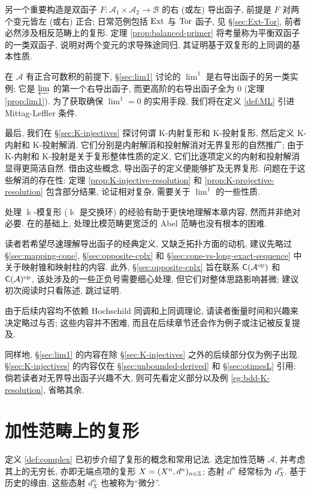 另一个重要构造是双函子 $F: \mathcal{A}_1 \times \mathcal{A}_2 \to \mathcal{B}$ 的右 (或左) 导出函子, 前提是 $F$ 对两个变元皆左 (或右) 正合; 日常范例包括 $\operatorname{Ext}$ 与 $\operatorname{Tor}$ 函子, 见 \S\ref{sec:Ext-Tor}, 前者必然涉及相反范畴上的复形. 定理 \ref{prop:balanced-primer} 将考量称为平衡双函子的一类双函子, 说明对两个变元的求导殊途同归, 其证明基于双复形的上同调的基本性质.

在 $\mathcal{A}$ 有正合可数积的前提下, \S\ref{sec:lim1} 讨论的 $\lim^1$ 是右导出函子的另一类实例; 它是 $\varprojlim$ 的第一个右导出函子, 而更高阶的右导出函子全为 $0$ (定理 \ref{prop:lim1}). 为了获取确保 $\lim^1 = 0$ 的实用手段, 我们将在定义 \ref{def:ML} 引进 Mittag-Leffler 条件.

最后, 我们在 \S\ref{sec:K-injectives} 探讨何谓 K-内射复形和 K-投射复形, 然后定义 K-内射和 K-投射解消. 它们分别是内射解消和投射解消对无界复形的自然推广; 由于 K-内射和 K-投射是关于复形整体性质的定义, 它们比逐项定义的内射和投射解消显得更简洁自然. 借由这些概念, 导出函子的定义便能够扩及无界复形. 问题在于这些解消的存在性: 定理 \ref{prop:K-injective-resolution} 和 \ref{prop:K-projective-resolution} 包含部分结果, 论证相对复杂, 需要关于 $\lim^1$ 的一些性质.

\begin{wenxintishi}	
	处理 $\Bbbk$-模复形 ($\Bbbk$ 是交换环) 的经验有助于更快地理解本章内容, 然而并非绝对必要. 在的基础上, 处理比模范畴更宽泛的 Abel 范畴也没有根本的困难.
	
	读者若希望尽速理解导出函子的经典定义, 又缺乏拓扑方面的动机, 建议先略过 \S\ref{sec:mapping-cone}, \S\ref{sec:opposite-cplx} 和 \S\ref{sec:cone-vs-long-exact-sequence} 中关于映射锥和映射柱的内容. 此外, \S\ref{sec:opposite-cplx} 旨在联系 $\mathsf{C}(\mathcal{A}^{\operatorname{op}})$ 和 $\mathsf{C}(\mathcal{A})^{\operatorname{op}}$, 该处涉及的一些正负号需要细心处理, 但它们对整体思路影响甚微; 建议初次阅读时只看陈述, 跳过证明. 

	由于后续内容均不依赖 Hochschild 同调和上同调理论, 请读者衡量时间和兴趣来决定略过与否; 这些内容并不困难, 而且在后续章节还会作为例子或注记被反复提及.

	同样地, \S\ref{sec:lim1} 的内容在除 \S\ref{sec:K-injectives} 之外的后续部分仅为例子出现. \S\ref{sec:K-injectives} 的内容仅在 \S\ref{sec:unbounded-derived} 和 \S\ref{sec:otimesL} 引用; 倘若读者对无界导出函子兴趣不大, 则可先看定义部分以及例 \ref{eg:bdd-K-resolution}, 省略其余.
\end{wenxintishi}

\section{加性范畴上的复形}\label{sec:additive-cplx}
定义 \ref{def:complex} 已初步介绍了复形的概念和常用记法. 选定加性范畴 $\mathcal{A}$, 并考虑其上的无穷长, 亦即无端点项的复形 $X = (X^n, d^n)_{n \in \mathbb{Z}}$; 态射 $d^n$ 经常标为 $d_X^n$. 基于历史的缘由, 这些态射 $d_X^n$ 也被称为``微分''.

